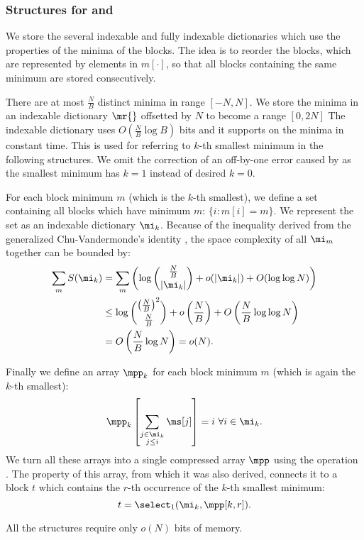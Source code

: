\subsubsection{Structures for \rmqSize{} and \rmqSelect{}}

We store the several indexable and fully indexable dictionaries which use the properties of the minima of the blocks.
The idea is to reorder the blocks, which are represented by elements in $m[\cdot]$, so that all blocks containing the same minimum are stored consecutively. 

There are at most $\frac{N}{B}$ distinct minima in range $[-N, N]$.
We store the minima in an indexable dictionary $\mr{}$ offsetted by $N$ to become a range $[0, 2 N]$
The indexable dictionary uses $O\left(\frac{N}{B} \log B\right)$ bits and it supports \rank{} on the minima in constant time.
This is used for referring to $k$-th smallest minimum in the following structures.
We omit the correction of an off-by-one error caused by \rank{} as the smallest minimum has $k = 1$ instead of desired $k = 0$.

For each block minimum $m$ (which is the $k$-th smallest), we define a set containing all blocks which have minimum $m$: $\{ i : m[i] = m\}$.
We represent the set as an indexable dictionary $\mi_k$.
Because of the inequality derived from the generalized Chu-Vandermonde's identity \cite{belbachircombinatorial}, the space complexity of all $\mi_m$ together can be bounded by:
\begin{align*}
	\sum_m S(\mi_k) &= \sum_m \left( \log {\frac{N}{B} \choose |\mi_k|} + o(|\mi_k|) + O(\log \log N) \right) \\
	&\le \log {\left(\frac{N}{B}\right)^2 \choose \frac{N}{B}} + o\left(\frac{N}{B}\right) + O\left(\frac{N}{B} \log \log N\right) \\
	&= O\left(\frac{N}{B} \log N\right) = o(N).
\end{align*}

Finally we define an array $\mpp_k$ for each block minimum $m$ (which is again the $k$-th smallest):
$$\mpp_k\left[\sum_{\substack{j \in \mi_k \\ j \le i}} \ms[j] \right] = i \ \forall i \in \mi_k.$$
We turn all these arrays into a single compressed array $\mpp$ using the operation \succ{}.
The property of this array, from which it was also derived, connects it to a block $t$ which contains the $r$-th occurrence of the $k$-th smallest minimum:
$$ t = \select_1(\mi_k, \mpp[k, r]). $$

All the structures require only $o(N)$ bits of memory.

